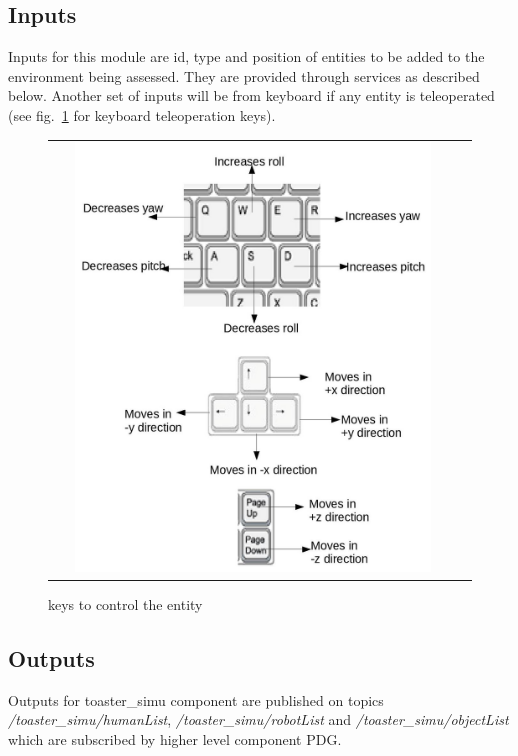 \documentclass[a4paper]{article}
\begin{document}
\subsection{Inputs}
Inputs for this module are id, type and position of entities to be added to the environment being assessed. They are provided through services as described below. Another set of inputs will be from keyboard if any entity is teleoperated (see fig.~\ref{fig:directions} for keyboard teleoperation keys).

\begin{figure}[ht!]
 \centering
 \begin{tabular}{cc}
  \includegraphics[width=0.9\textwidth]{img/directions.jpg}
 \end{tabular}
 \caption{keys to control the entity}
 \label{fig:directions}
 \end{figure}

\subsection{Outputs}
Outputs for toaster\_simu component are published on topics \textit{/toaster\_simu/humanList}, \textit{/toaster\_simu/robotList} and \textit{/toaster\_simu/objectList} which are subscribed by higher level component PDG.
\end{document}
